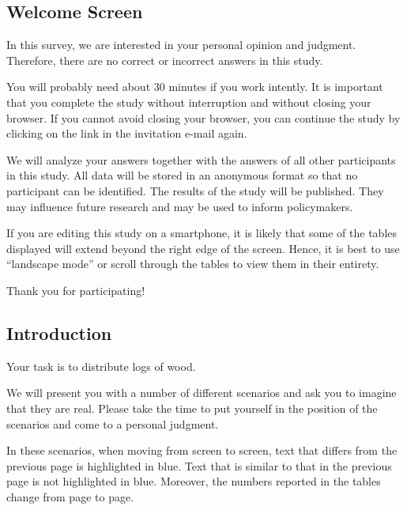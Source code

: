 \documentclass[smallcondensed]{svjour3}
\begin{document}
\subsection*{Welcome Screen}
%
In this survey, we are interested in your personal opinion and judgment. Therefore, there are no correct or incorrect answers in this study.\par
%
You will probably need about 30 minutes if you work intently. It is important that you complete the study without interruption and without closing your browser. If you cannot avoid closing your browser, you can continue the study by clicking on the link in the invitation e-mail again.\par
%
We will analyze your answers together with the answers of all other participants in this study. All data will be stored in an anonymous format so that no participant can be identified. The results of the study will be published. They may influence future research and may be used to inform policymakers.\par
%
If you are editing this study on a smartphone, it is likely that some of the tables displayed will extend beyond the right edge of the screen. Hence, it is best to use ``landscape mode'' or scroll through the tables to view them in their entirety.\par
%
Thank you for participating!\par
%
\subsection*{Introduction}\label{sec:app_introduction}
%
Your task is to distribute logs of wood.\par
%
We will present you with a number of different scenarios and ask you to imagine that they are real. Please take the time to put yourself in the position of the scenarios and come to a personal judgment.\par
%
In these scenarios, when moving from screen to screen, text that differs from the previous page is highlighted in blue. Text that is similar to that in the previous page is not highlighted in blue. Moreover, the numbers reported in the tables change from page to page.\par
%
\end{document}
